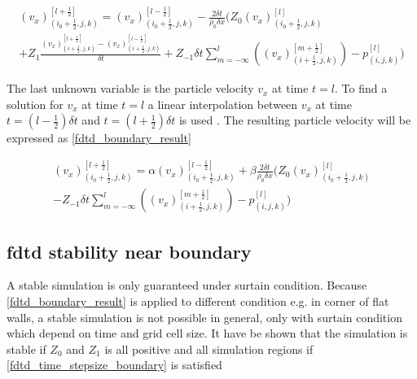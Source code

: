 \begin{multline}\label{fdtd_boundary_velocity2}
(v_x)_{(i_0+\frac{1}{2},j,k)}^{[l+\frac{1}{2}]}= (v_x)_{(i_0+\frac{1}{2},j,k)}^{[l-\frac{1}{2}]}-\frac{2 \delta t}{\rho_0 \delta x} \Biggl( 
 Z_0(v_x)_{(i_0+\frac{1}{2},j,k)}^{[l]} \\
+Z_1\frac{(v_x)_{(i+\frac{1}{2},j,k)}^{[l+\frac{1}{2}]}-(v_x)_{(i+\frac{1}{2},j,k)}^{[l-\frac{1}{2}]}}{\delta t}+Z_{-1} \delta t \sum_{m=-\infty}^{l} \left( (v_x)_{(i+\frac{1}{2},j,k)}^{[m+\frac{1}{2}]} \right) -p_{(i,j,k)}^{[l]}
\Biggr)
\end{multline}

The last unknown variable is the particle velocity $v_x$ at time $t=l$. To find a solution for $v_x$ at time  $t=l$  a linear interpolation between $v_x$ at time $t=(l-\frac{1}{2}) \delta t$ and $t=(l+\frac{1}{2}) \delta t$ is used \citep{finiteproblems}. The resulting particle velocity will be expressed as \autoref{fdtd_boundary_result}

\begin{multline}\label{fdtd_boundary_result}
(v_x)_{(i_0+\frac{1}{2},j,k)}^{[l+\frac{1}{2}]}= \alpha (v_x)_{(i_0+\frac{1}{2},j,k)}^{[l-\frac{1}{2}]} + \beta \frac{2 \delta t}{\rho_0 \delta x} \Biggl( 
 Z_0(v_x)_{(i_0+\frac{1}{2},j,k)}^{[l]} \\
-Z_{-1} \delta t \sum_{m=-\infty}^{l} \left( (v_x)_{(i+\frac{1}{2},j,k)}^{[m+\frac{1}{2}]} \right) -p_{(i,j,k)}^{[l]}
\Biggr)
\end{multline}


         \startexplain
    \stopexplain


\subsection{\gls{fdtd} stability near boundary}
A stable simulation is only guaranteed under surtain condition. Because \autoref{fdtd_boundary_result} is applied to different condition e.g. in corner of flat walls, a stable simulation is not possible in general, only with surtain condition which depend on time and grid cell size. It have be shown that the simulation is stable if $Z_0$ and $Z_{1}$ is all positive and all simulation regions if \autoref{fdtd_time_stepsize_boundary} is satisfied

